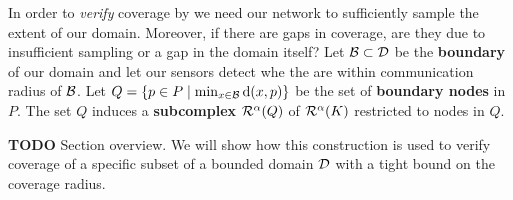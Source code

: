 In order to \textit{verify} coverage by we need our network to sufficiently sample the extent of our domain.
Moreover, if there are gaps in coverage, are they due to insufficient sampling or a gap in the domain itself?
Let ${\mathcal{B}}\subset{\mathcal{D}}$ be the \textbf{boundary} of our domain and let our sensors detect whe the are within communication radius of ${\mathcal{B}}$.
Let $Q = \{p\in P\mid \min_{x\in{\mathcal{B}}}\mathrm{d}(x, p)\}$ be the set of \textbf{boundary nodes} in $P$.
The set $Q$ induces a \textbf{subcomplex} $\mathcal{R}^\alpha(Q)$ of $\mathcal{R}^\alpha(K)$ restricted to nodes in $Q$.

\textbf{TODO} Section overview.
We will show how this construction is used to verify coverage of a specific subset of a bounded domain ${\mathcal{D}}$ with a tight bound on the coverage radius.


